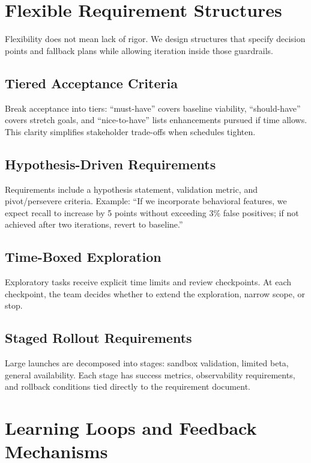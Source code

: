 \section{Flexible Requirement Structures}
\label{sec:flexible-structures}

Flexibility does not mean lack of rigor. We design structures that specify decision points and fallback plans while allowing iteration inside those guardrails.

\subsection{Tiered Acceptance Criteria}
Break acceptance into tiers: ``must-have'' covers baseline viability, ``should-have'' covers stretch goals, and ``nice-to-have'' lists enhancements pursued if time allows. This clarity simplifies stakeholder trade-offs when schedules tighten.

\subsection{Hypothesis-Driven Requirements}
Requirements include a hypothesis statement, validation metric, and pivot/persevere criteria. Example: ``If we incorporate behavioral features, we expect recall to increase by 5 points without exceeding 3\% false positives; if not achieved after two iterations, revert to baseline.''

\subsection{Time-Boxed Exploration}
Exploratory tasks receive explicit time limits and review checkpoints. At each checkpoint, the team decides whether to extend the exploration, narrow scope, or stop.

\subsection{Staged Rollout Requirements}
Large launches are decomposed into stages: sandbox validation, limited beta, general availability. Each stage has success metrics, observability requirements, and rollback conditions tied directly to the requirement document.

\section{Learning Loops and Feedback Mechanisms}
\label{sec:learning-loops}

